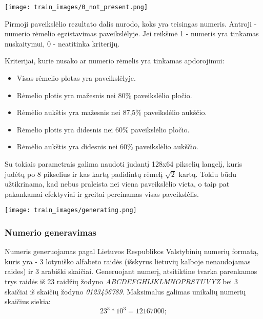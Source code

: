\documentclass{VUMIFPSkursinis}
\begin{document}
\begin{minipage}{\linewidth}
  \centering
  \texttt{[image: train\_images/0\_not\_present.png]}
\end{minipage}

Pirmoji paveikslėlio rezultato dalis nurodo, koks yra teisingas numeris. Antroji - numerio rėmelio egzistavimas paveikslėlyje.
Jei reikšmė 1 - numeris yra tinkamas nuskaitymui, 0 - neatitinka kriterijų. 

Kriterijai, kurie nusako ar numerio rėmelis yra tinkamas apdorojimui:

\begin{itemize}
  \item Visas rėmelio plotas yra paveikslėlyje.
  \item Rėmelio plotis yra mažesnis nei 80\% paveikslėlio pločio.
  \item Rėmėlio aukštis yra mažesnis nei 87,5\% paveikslėlio aukščio.
  \item Rėmelio plotis yra didesnis nei 60\% paveikslėlio pločio.
  \item Rėmėlio aukštis yra didesnis nei 60\% paveikslėlio aukščio.
\end{itemize}

Su tokiais parametrais galima naudoti judantį 128x64 pikselių langelį, kuris judėtų po 8 pikselius ir kas kartą padidintų rėmelį
\begin{math}
  \sqrt{2}
\end{math}
kartų. Tokiu būdu užtikrinama, kad nebus praleista nei viena paveikslėlio vieta, o taip pat pakankamai efektyviai ir greitai pereinamas
visas paveikslėlis.

\begin{minipage}{\linewidth}
  \centering
  \texttt{[image: train\_images/generating.png]}
\end{minipage}

\subsubsection{Numerio generavimas}
Numeris generuojamas pagal Lietuvos Respublikos Valstybinių numerių formatą, kuris yra - 3 lotyniško alfabeto
raidės (išskyrus lietuvių kalboje nenaudojamas raides) ir 3 arabiški skaičiai. Generuojant numerį, 
atsitiktine tvarka parenkamos trys raidės iš 23 raidžių žodyno \textit{ABCDEFGHIJKLMNOPRSTUVYZ} bei 3 skaičiai 
iš skaičių žodyno \textit{0123456789}. Maksimalus galimas unikalių numerių skaičius siekia:
\begin{equation}
  23^3 * 10^3 = 12167000;
\end{equation}
\end{document}
